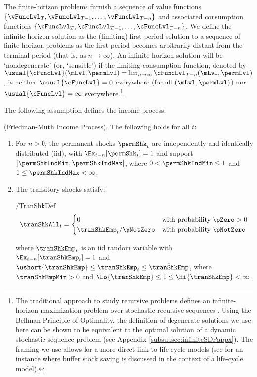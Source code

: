 \documentclass[BufferStockTheory]{subfiles}
\begin{document}
The finite-horizon problems furnish a sequence of value functions $\{\vFuncLvl_{T},\vFuncLvl_{T-1},\ldots,\vFuncLvl_{T-n}\}$ and associated consumption functions $\{\cFuncLvl_{T},\cFuncLvl_{T-1},\ldots,\cFuncLvl_{T-n}\}$. We define the infinite-horizon solution as the (limiting) first-period solution to a sequence of finite-horizon problems as the first period becomes arbitrarily distant from the terminal period (that is, as $n \rightarrow \infty$). An infinite-horizon solution will be `nondegenerate' (or, `sensible') if the limiting consumption function, denoted by $\usual{\cFuncLvl}(\mLvl,\permLvl) = \lim_{n \rightarrow \infty} \cFuncLvl_{T-n}(\mLvl,\permLvl)$, is neither $\usual{\cFuncLvl}=0$ everywhere (for all $(\mLvl,\permLvl)$) nor $\usual{\cFuncLvl}=\infty$ everywhere.\footnote{The traditional approach to study recursive problems defines an infinite-horizon maximization problem over stochastic recursive sequences \citep{sargstach2023}. Using the Bellman Principle of Optimality, the definition of degenerate solutions we use here can be shown to be equivalent to the optimal solution of a dynamic stochastic sequence problem (see Appendix \ref{subsubsec:infiniteSDPappx}). The framing we use allows for a more direct link to life-cycle models (see \cite{gpLifeCycle} for an instance where buffer stock saving is discussed in the context of a life-cycle model).} 

The following assumption defines the income process. 

\begin{assumI}\label{ass:shocks}(Friedman-Muth Income Process).
The following holds for all $t$:
\begin{enumerate}
\item For $n>0$, the permanent shocks ${\permShk}_{t}$ are independently and identically distributed (iid), with  $\Ex_{t-n}[{\permShk}_{t}]=1$ and support $[\permShkIndMin,\permShkIndMax]$, where $0 < \permShkIndMin \leq 1$ and $1 \leq \permShkIndMax < \infty$. 
\item The transitory shocks satisfy: 
\begin{verbatimwrite}{\EqDir/TranShkDef}
  \begin{equation}
    \tranShkAll_{t}=
    \begin{cases}
      0\phantom{_{t+1}/\pNotZero} & \text{with probability $\pZero > 0$} \\
      \tranShkEmp_{t}/\pNotZero      & \text{with probability $\pNotZero  $} %
    \end{cases} \label{eq:TranShkDef}
  \end{equation}
\end{verbatimwrite}

\noindent where $\tranShkEmp_{t}$ is an iid random variable with $\Ex_{t-n}[{\tranShkEmp}_{t}]=1$ and $\ushort{\tranShkEmp}\leq  \tranShkEmp_{t} \leq \bar{\tranShkEmp}$, where $\tranShkEmpMin >0$ and $\Lo{\tranShkEmp} \leq 1 \leq \Hi{\tranShkEmp} < \infty$. 
\end{enumerate} 
\end{assumI}
\end{document}
